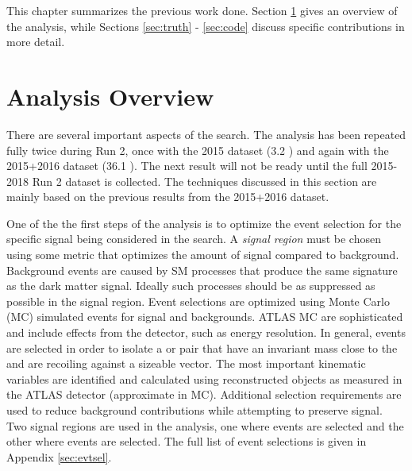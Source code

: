 \label{chapter:prevWork}

This chapter summarizes the previous work done. Section \ref{sec:analysis} gives an overview of the analysis, while Sections \ref{sec:truth} - \ref{sec:code} discuss specific contributions in more detail.

\section{Analysis Overview}
\label{sec:analysis}

There are several important aspects of the \monoZ search. The analysis has been repeated fully twice during Run 2, once with the 2015 dataset (3.2 \ifb) and again with the 2015+2016 dataset (36.1 \ifb). The next result will not be ready until the full 2015-2018 Run 2 dataset is collected. The techniques discussed in this section are mainly based on the previous results from the 2015+2016 dataset. 

One of the the first steps of the analysis is to optimize the event selection for the specific signal being considered in the search. A \textit{signal region} must be chosen using some metric that optimizes the amount of signal compared to background. Background events are caused by SM processes that produce the same signature as the dark matter signal. Ideally such processes should be as suppressed as possible in the signal region. Event selections are optimized using Monte Carlo (MC) simulated events for signal and backgrounds. ATLAS MC are sophisticated and include effects from the detector, such as energy resolution. In general, events are selected in order to isolate a \epem or \mpmm pair that have an invariant mass close to the \Z and are recoiling against a sizeable \etmiss vector. The most important kinematic variables are identified and calculated using reconstructed objects as measured in the ATLAS detector (approximate in MC). Additional selection requirements are used to reduce background contributions while attempting to preserve signal. Two signal regions are used in the \monoZ analysis, one where \epem events are selected and the other where \mpmm events are selected. The full list of event selections is given in Appendix \ref{sec:evtsel}.

